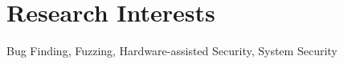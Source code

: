 \section*{Research Interests}
\begin{description}

\item Bug Finding, Fuzzing, Hardware-assisted Security, System Security
\end{description}
